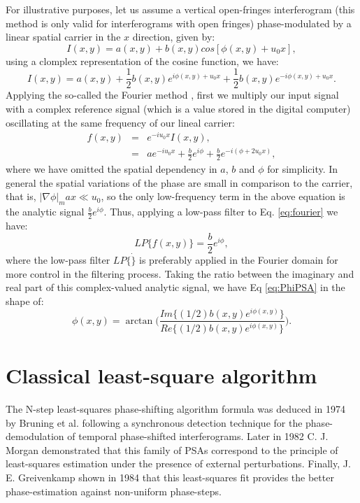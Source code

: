 For illustrative purposes, let us assume a vertical open-fringes interferogram 
(this method is only valid for interferograms with open fringes) phase-modulated 
by a linear spatial carrier in the $x$ direction, given by:
\begin{equation}
    I(x,y) = a(x,y)+b(x,y)cos[\phi(x,y)+u_0 x],
\end{equation}
using a clomplex representation of the cosine function, we have:
\begin{equation}
    I(x,y)=a(x,y)+ \frac{1}{2} b(x,y)e^{i \phi(x,y)+u_0 x} 
    +\frac{1}{2} b(x,y) e^{-i \phi(x,y)+u_0 x}.
\end{equation}
Applying the so-called the Fourier method \cite{Ichioka:72,Takeda:82}, first 
we multiply 
our input signal with a complex reference signal (which is a value stored in the 
digital computer) oscillating at the same frequency of our lineal carrier:
\begin{eqnarray}\label{eq:fourier}
    f(x,y) &=& e^{-i u_0 x} I(x,y), \nonumber \\
	   &=& a e^{-i u_0 x} + \frac{b}{2} e^{i \phi}
	      + \frac{b}{2}  e^{-i(\phi+2u_0 x)},
\end{eqnarray}
where we have omitted the spatial dependency in $a$, $b$ and $\phi$ for simplicity.
In general the spatial variations of the phase are small in comparison to the
carrier, that is, $|\nabla \phi|_max \ll  u_0 $, so the only low-frequency term 
in the above equation is the analytic signal $\frac{b}{2} e^{i \phi}$. Thus, 
applying a low-pass filter \cite{Granlund2010} to Eq. \eqref{eq:fourier} we have:
\begin{equation}
 LP\{f(x,y)\} = \frac{b}{2} e^{i \phi},
\end{equation}
where the low-pass filter $LP \{\dot \}$ is preferably applied in the Fourier 
domain for
more control in the filtering process. Taking the ratio between the imaginary
and real part of this complex-valued analytic signal, we have Eq \eqref{eq:PhiPSA} 
in the shape of:
\begin{equation}
 \phi(x,y) = \arctan \Bigg(\frac{Im\{ (1/2) b(x,y) e^{i \phi(x,y)} \}}
		      {Re\{(1/2) b(x,y) e^{i \phi(x,y)}\} } \Bigg).
\end{equation}

\section{Classical least-square algorithm}

The N-step least-squares phase-shifting algorithm formula was deduced in
1974 by Bruning et al. \cite{Bruning:74} following a synchronous detection 
technique for the phase-demodulation of temporal phase-shifted interferograms. 
Later in 1982 C. J. Morgan \cite{Morgan} demonstrated that this family of PSAs 
correspond to the principle of least-squares estimation under the presence of 
external perturbations. Finally, J. E. Greivenkamp \cite{Greivenkamp} shown in 
1984 that this least-squares fit provides the better phase-estimation against 
non-uniform phase-steps.

